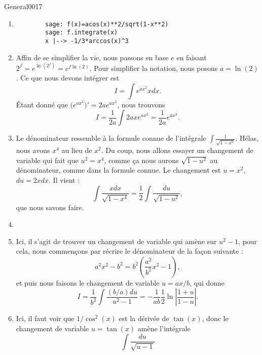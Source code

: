 \begin{corrige}{General0017}
\begin{enumerate}
\item
	\begin{verbatim}
		sage: f(x)=acos(x)**2/sqrt(1-x**2)
		sage: f.integrate(x)              
		x |--> -1/3*arccos(x)^3
	\end{verbatim}
\item
Affin de se simplifier la vie, nous passons en base $e$ en faisant $2^f= e^{\ln(2^f)}= e^{f\ln(2)}$. Pour simplifier la notation, nous posons $a=\ln(2)$. Ce que nous devons intégrer est
\begin{equation}	
	I=\int e^{ax^2}xdx.
\end{equation}
Étant donné que $\big(  e^{ax^2} \big)'=2a e^{ax^2}$, nous trouvons
\begin{equation}
	I=\frac{ 1 }{ 2a }\int2ax e^{ax^2}=\frac{1}{ 2a } e^{ax^2}.
\end{equation}

\item
Le dénominateur ressemble à la formule connue de l'intégrale $\int\frac{1}{ \sqrt{1-x^2} }$. Hélas, nous avons $x^4$ au lieu de $x^2$. Du coup, nous allons essayer un changement de variable qui fait que $u^2=x^4$, comme ça nous aurons $\sqrt{1-u^2}$ au dénominateur, comme dans la formule connue. Le changement est $u=x^2$, $du=2xdx$. Il vient :
\begin{equation}
	\int\frac{ xdx }{ \sqrt{1-x^4} }=\frac{ 1 }{2}\int\frac{ du }{ \sqrt{1-u^2} },
\end{equation}
que nous savons faire.

\item
\item
Ici, il s'agit de trouver un changement de variable qui amène sur $u^2-1$, pour cela, nous commençons par récrire le dénominateur de la façon suivante :
\begin{equation}
	a^2x^2-b^2=b^2(\frac{ a^2 }{ b^2 }x^2-1),
\end{equation}
et puis nous faisons le changement de variable $u=ax/b$, qui donne
\begin{equation}
	I=\frac{1}{ b^2 }\int\frac{ (b/a)du }{ u^2-1 }=-\frac{1}{ ab }\frac{ 1 }{2}\ln\left| \frac{ 1+u }{ 1-u } \right| .
\end{equation}

\item
Ici, il faut voir que $1/\cos^2(x)$ est la dérivée de $\tan(x)$, donc le changement de variable $u=\tan(x)$ amène l'intégrale
\begin{equation}
	\int\frac{ du }{ \sqrt{u-1} }
\end{equation}


\end{enumerate}
\end{corrige}
